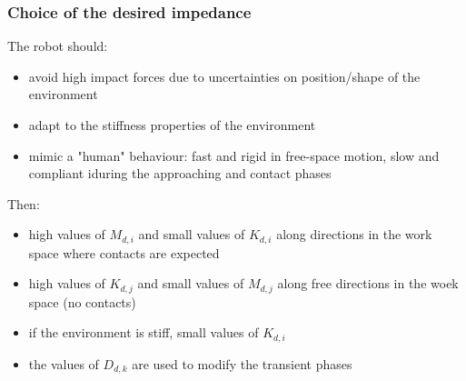 \documentclass{book}
\begin{document}
\subsubsection{Choice of the desired impedance}
The robot should:
\begin{itemize}
    \item avoid high impact forces due to uncertainties on position/shape of the environment 
    \item adapt to the stiffness properties of the environment 
    \item mimic a "human" behaviour: fast and rigid in free-space motion, slow and compliant iduring the approaching and contact phases 
\end{itemize}
Then:
\begin{itemize}
    \item high values of $M_{d,i}$ and small values of $K_{d,i}$ along directions in the work space where contacts are expected 
    \item high values of $K_{d,j}$ and small values of $M_{d,j}$ along free directions in the woek space (no contacts) 
    \item if the environment is stiff, small values of $K_{d,i}$ 
    \item the values of $D_{d,k}$ are used to modify the transient phases
\end{itemize}
\end{document}
